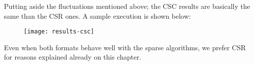 Putting aside the fluctuations mentioned above; the CSC results are
basically the same than the CSR ones. A sample execution is shown
below: 

\begin{figure}[H]
  \centering
  \texttt{[image: results-csc]}
\end{figure}

Even when both formats behave well with the sparse algorithms, we
prefer CSR for reasons explained already on this chapter.
